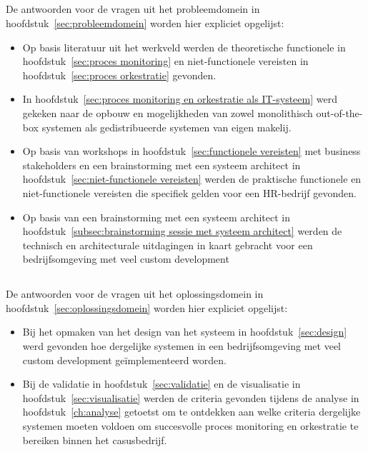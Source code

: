 \subsection{}%
\label{subsec:probleemdomein conclusie}
De antwoorden voor de vragen uit het probleemdomein in hoofdstuk~\ref{sec:probleemdomein} worden hier expliciet opgelijst:
\begin{itemize}
  \item Op basis literatuur uit het werkveld werden de theoretische functionele in hoofdstuk~\ref{sec:proces monitoring} en niet-functionele vereisten in hoofdstuk~\ref{sec:proces orkestratie} gevonden.
  \item In hoofdstuk~\ref{sec:proces monitoring en orkestratie als IT-systeem} werd gekeken naar de opbouw en mogelijkheden van zowel monolithisch out-of-the-box systemen als gedistribueerde systemen van eigen makelij.
  \item Op basis van workshops in hoofdstuk~\ref{sec:functionele vereisten} met business stakeholders en een brainstorming met een systeem architect in hoofdstuk~\ref{sec:niet-functionele vereisten} werden de praktische functionele en niet-functionele vereisten die specifiek gelden voor een HR-bedrijf gevonden.
  \item Op basis van een brainstorming met een systeem architect in hoofdstuk~\ref{subsec:brainstorming sessie met systeem architect} werden de technisch en architecturale uitdagingen in kaart gebracht voor een bedrijfsomgeving met veel custom development
\end{itemize}

\subsection{}%
\label{subsec:oplossingsdomein conclusie}
De antwoorden voor de vragen uit het oplossingsdomein in hoofdstuk~\ref{sec:oplossingsdomein} worden hier expliciet opgelijst:
\begin{itemize}
  \item Bij het opmaken van het design van het systeem in hoofdstuk~\ref{sec:design} werd gevonden hoe dergelijke systemen in een bedrijfsomgeving met veel custom development geïmplementeerd worden. 
  \item Bij de validatie in hoofdstuk~\ref{sec:validatie} en de visualisatie in hoofdstuk~\ref{sec:visualisatie} werden de criteria gevonden tijdens de analyse in hoofdstuk~\ref{ch:analyse} getoetst om te ontdekken aan welke criteria dergelijke systemen moeten voldoen om succesvolle proces monitoring en orkestratie te bereiken binnen het casusbedrijf.
\end{itemize}

